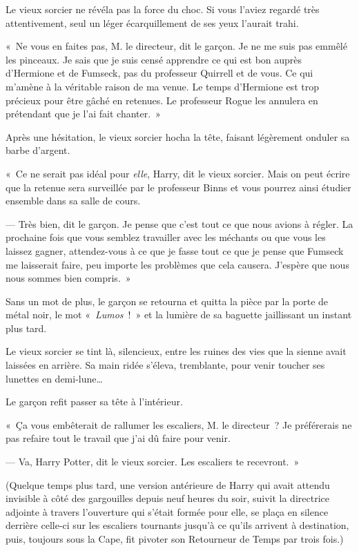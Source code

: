 Le vieux sorcier ne révéla pas la force du choc. Si vous l'aviez regardé très attentivement, seul un léger écarquillement de ses yeux l'aurait trahi.

«~Ne vous en faites pas, M. le directeur, dit le garçon. Je ne me suis pas emmêlé les pinceaux. Je sais que je suis censé apprendre ce qui est bon auprès d'Hermione et de Fumseck, pas du professeur Quirrell et de vous. Ce qui m'amène à la véritable raison de ma venue. Le temps d'Hermione est trop précieux pour être gâché en retenues. Le professeur Rogue les annulera en prétendant que je l'ai fait chanter.~»

Après une hésitation, le vieux sorcier hocha la tête, faisant légèrement onduler sa barbe d'argent.

«~Ce ne serait pas idéal pour \emph{elle}, Harry, dit le vieux sorcier. Mais on peut écrire que la retenue sera surveillée par le professeur Binns et vous pourrez ainsi étudier ensemble dans sa salle de cours.

--- Très bien, dit le garçon. Je pense que c'est tout ce que nous avions à régler. La prochaine fois que vous semblez travailler avec les méchants ou que vous les laissez gagner, attendez-vous à ce que je fasse tout ce que je pense que Fumseck me laisserait faire, peu importe les problèmes que cela causera. J'espère que nous nous sommes bien compris.~»

Sans un mot de plus, le garçon se retourna et quitta la pièce par la porte de métal noir, le mot «~\emph{Lumos}~!~» et la lumière de sa baguette jaillissant un instant plus tard.

Le vieux sorcier se tint là, silencieux, entre les ruines des vies que la sienne avait laissées en arrière. Sa main ridée s'éleva, tremblante, pour venir toucher ses lunettes en demi-lune…

Le garçon refit passer sa tête à l'intérieur.

«~Ça vous embêterait de rallumer les escaliers, M. le directeur~? Je préférerais ne pas refaire tout le travail que j'ai dû faire pour venir.

--- Va, Harry Potter, dit le vieux sorcier. Les escaliers te recevront.~»

(Quelque temps plus tard, une version antérieure de Harry qui avait attendu invisible à côté des gargouilles depuis neuf heures du soir, suivit la directrice adjointe à travers l'ouverture qui s'était formée pour elle, se plaça en silence derrière celle-ci sur les escaliers tournants jusqu'à ce qu'ils arrivent à destination, puis, toujours sous la Cape, fit pivoter son Retourneur de Temps par trois fois.)

